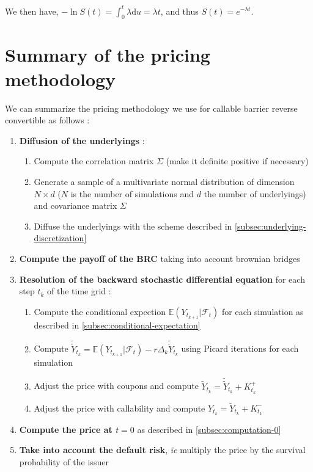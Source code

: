 \documentclass[a4paper,11pt,english]{book}
\begin{document}
We then have, $-\ln{S(t)}=\int_{0}^{t}\lambda \text{d}u = \lambda t$, and thus $S(t)=e^{-\lambda t}$.

\section{Summary of the pricing methodology}
\label{sec:summary}
We can summarize the pricing methodology we use for callable barrier reverse convertible as follows :
\begin{enumerate}
    \item \textbf{Diffusion of the underlyings} :
    \begin{enumerate}
        \item Compute the correlation matrix $\Sigma$ (make it definite positive if necessary)
        \item Generate a sample of a multivariate normal distribution of dimension $N\times d$ ($N$ is the number of simulations and $d$ the number of underlyings) and covariance matrix  $\Sigma$ 
        \item Diffuse the underlyings with the scheme described in \ref{subsec:underlying-discretization}
    \end{enumerate}
    \item \textbf{Compute the payoff of the BRC} taking into account brownian bridges
    \item \textbf{Resolution of the backward stochastic differential equation} for each step $t_{k}$ of the time grid :
    \begin{enumerate}
        \item Compute the conditional expection $\mathbb{E}(Y_{t_{k+1}}|\mathcal{F}_{t})$ for each simulation as described in \ref{subsec:conditional-expectation}
        \item Compute $\widetilde{\widetilde{Y}}_{t_{k}}=\mathbb{E}(Y_{t_{k+1}}|\mathcal{F}_{t}) -r\Delta_{k}\widetilde{\widetilde{Y}}_{t_{k}}$ using Picard iterations for each simulation
        \item Adjust the price with coupons and compute $\widetilde{Y}_{t_{k}} = \widetilde{\widetilde{Y}}_{t_{k}} + K_{t_{k}}^{+}$
        \item Adjust the price with callability and compute $Y_{t_{k}} = \widetilde{Y}_{t_{k}} + K_{t_{k}}^{-}$
    \end{enumerate}
    \item \textbf{Compute the price at $t=0$} as described in \ref{subsec:computation-0}
    \item \textbf{Take into account the default risk}, \textit{ie} multiply the price by the survival probability of the issuer
\end{enumerate}
\end{document}

